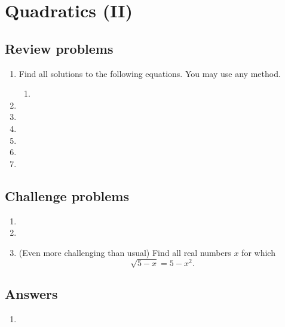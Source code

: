 \section{Quadratics (II)}

\subsection{Review problems}

\begin{enumerate}
\item Find all solutions to the following equations. You may use any method.
\begin{enumerate}
\item 
\end{enumerate}
\item %
\item %
\item %
\item %
\item %
\item %
\end{enumerate}


\subsection{Challenge problems}

\begin{enumerate}[resume]
\item %
\item %
\item (Even more challenging than usual) Find all real numbers $x$ for which
\begin{equation*}
\sqrt{5 - x} = 5 - x^2.
\end{equation*}
\end{enumerate}


\newpage
\subsection{Answers}

\begin{enumerate}
\item 
\end{enumerate}